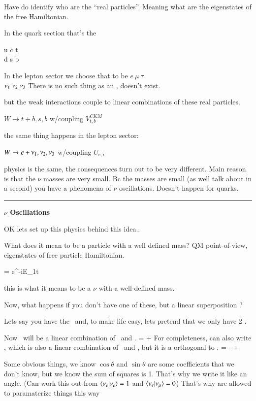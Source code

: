 {Have do identify who are the ``real particles''. 
Meaning what are the eigenstates of the free Hamiltonian.

In the quark section that's the 
\begin{center}
u c t \\
d s b
\end{center}
In the lepton sector we choose that to be 
\bc
$e\ \mu\ \tau$ \\
$\nu_1\ \nu_2\ \nu_3 $
\ec
There is no such thing as an \nue, doesn't exist. 

but the weak interactions couple to linear combinations of these real particles.  

$W \rightarrow t + b,s,b$ w/coupling $V^{CKM}_{t,b}$

the same thing happens in the lepton sector:


$W \rightarrow e + \nu_1,\nu_2,\nu_3$ w/coupling $U_{e,i}$

physics is the same,  the consequences turn out to be very different.  
Main reason is that the $\nu$ masses  are very small. 
Bc the masses are small (as well talk about in a second) you have a phenomena of $\nu$ oscillations.
Doesn't happen for quarks. 

\noindent\rule{\textwidth}{1pt}

\textbf{$\nu$ Oscillations}

OK lets set up this physics behind this idea.. 

What does it mean to be a particle with a well defined mass?
QM point-of-view, eigenstates of free particle Hamiltonian. 

\be
{} =  e^{-iE_1t} \ket{\nuone}
\ee

this is what it means to be a $\nu$ with a well-defined mass.

Now, what happens if you don't have one of these, but a linear superposition  ?

Lets say you have the \nue\ and, to make life easy, lets pretend that we only have 2 \nus. 

Now \nue\ will be a linear combination of \nuone\ and \nutwo. 
\be
\ket{\nue} = \cos\theta \ket{\nuone} + \sin\theta \ket{\nutwo}
\ee
For completeness, can also write \numu, which is also a linear combination of \nuone\ and \nutwo, but it is a orthogonal to \nue.
\be
\ket{\numu} = -\sin\theta \ket{\nuone} + \cos\theta \ket{\nutwo}
\ee


Some obvious things, we know $\cos\theta$ and $\sin\theta$ are some coefficients that we don't know, but we know the sum of squares is 1. 
That's why we write it like an angle.
(Can work this out from  $\braket{\nu_e | \nu_e}  = 1$ and $\braket{\nu_e | \nu_\mu}  = 0$)
That's why are allowed to paramaterize things this way

}
